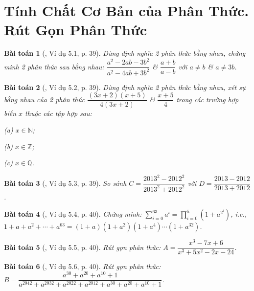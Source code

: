 \documentclass{article}
\numberwithin{equation}{section}
\newtheorem{baitoan}{Bài toán}
\begin{document}

\section{Tính Chất Cơ Bản của Phân Thức. Rút Gọn Phân Thức}

\begin{baitoan}[\cite{Binh_Nam_Ngoc_Son_Toan_8_Dai_So}, Ví dụ 5.1, p. 39]
	Dùng định nghĩa 2 phân thức bằng nhau, chứng minh 2 phân thức sau bằng nhau: $\dfrac{a^2 - 2ab - 3b^2}{a^2 - 4ab + 3b^2}$ \& $\dfrac{a + b}{a - b}$ với $a\ne b$ \& $a\ne 3b$.
\end{baitoan}

\begin{baitoan}[\cite{Binh_Nam_Ngoc_Son_Toan_8_Dai_So}, Ví dụ 5.2, p. 39]
	Dùng định nghĩa 2 phân thức bằng nhau, xét sự bằng nhau của 2 phân thức $\dfrac{(3x + 2)(x + 5)}{4(3x + 2)}$ \& $\dfrac{x + 5}{4}$ trong các trường hợp biến $x$ thuộc các tập hợp sau:
	\begin{enumerate*}
		\item[(a)] $x\in\mathbb{N}$;
		\item[(b)] $x\in\mathbb{Z}$;
		\item[(c)] $x\in\mathbb{Q}$.
	\end{enumerate*}
\end{baitoan}

\begin{baitoan}[\cite{Binh_Nam_Ngoc_Son_Toan_8_Dai_So}, Ví dụ 5.3, p. 39]
	So sánh $C = \dfrac{2013^2 - 2012^2}{2013^2 + 2012^2}$ với $D = \dfrac{2013 - 2012}{2013 + 2012}$.
\end{baitoan}

\begin{baitoan}[\cite{Binh_Nam_Ngoc_Son_Toan_8_Dai_So}, Ví dụ 5.4, p. 40]
	Chứng minh: $\sum_{i=0}^{63} a^i = \prod_{i=0}^{5} (1 + a^{2^i})$, i.e., $1 + a + a^2 + \cdots + a^{63} = (1 + a)(1 + a^2)(1 + a^4)\cdots(1 + a^{32})$.
\end{baitoan}

\begin{baitoan}[\cite{Binh_Nam_Ngoc_Son_Toan_8_Dai_So}, Ví dụ 5.5, p. 40]
	Rút gọn phân thức: $A = \dfrac{x^3 - 7x + 6}{x^3 + 5x^2 - 2x - 24}$.
\end{baitoan}

\begin{baitoan}[\cite{Binh_Nam_Ngoc_Son_Toan_8_Dai_So}, Ví dụ 5.6, p. 40]
	Rút gọn phân thức: $B = \dfrac{a^{30} + a^{20} + a^{10} + 1}{a^{2042} + a^{2032} + a^{2022} + a^{2012} + a^{30} + a^{20} + a^{10} + 1}$.
\end{baitoan}
\end{document}
